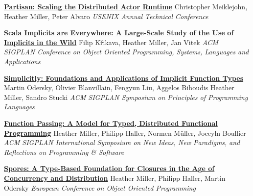 \documentclass[9pt]{article}
\begin{document}
\noindent\href{https://www.usenix.org/system/files/atc19-meiklejohn.pdf}{\bf Partisan: Scaling the Distributed Actor Runtime}
\newline\noindent Christopher Meiklejohn, Heather Miller, Peter Alvaro
\newline\noindent\emph{USENIX Annual Technical Conference}
\bigskip

\noindent\href{https://arxiv.org/pdf/1908.07883}{\bf Scala Implicits are Everywhere: A Large-Scale Study of the Use}\vspace{-0.03in}
\newline\noindent\href{https://arxiv.org/pdf/1908.07883}{\bf of Implicits in the Wild}
\newline\noindent Filip K\v{r}ikava, Heather Miller, Jan Vitek
\newline\noindent\emph{ACM SIGPLAN Conference on Object Oriented Programming, Systems,}
\newline\noindent\emph{Languages and Applications}
\bigskip

\noindent\href{https://infoscience.epfl.ch/record/229878}{\bf Simplicitly: Foundations and Applications of Implicit Function Types}
\newline\noindent Martin Odersky, Olivier Blanvillain, Fengyun Liu, Aggelos Biboudis
\newline\noindent Heather Miller, Sandro Stucki
\newline\noindent\emph{ACM SIGPLAN Symposium on Principles of Programming Languages}
\bigskip

\noindent\href{https://infoscience.epfl.ch/record/205822}{\bf Function Passing: A Model for Typed, Distributed Functional}\vspace{-0.03in}
\newline\noindent\href{https://infoscience.epfl.ch/record/205822}{\bf Programming}
\newline\noindent Heather Miller, Philipp Haller, Normen M\"{u}ller, Joceyln Boullier
\newline\noindent\emph{ACM SIGPLAN International Symposium on New Ideas, New Paradigms,}
\newline\noindent\emph{and Reflections on Programming \& Software}
\bigskip

\noindent\href{http://infoscience.epfl.ch/record/191239}{\bf Spores: A Type-Based Foundation for Closures in the Age of}\vspace{-0.03in}
\newline\noindent\href{http://infoscience.epfl.ch/record/191239}{\bf Concurrency and Distribution}
\newline\noindent Heather Miller, Philipp Haller, Martin Odersky
\newline\noindent\emph{European Conference on Object Oriented Programming}
\bigskip
\end{document}
